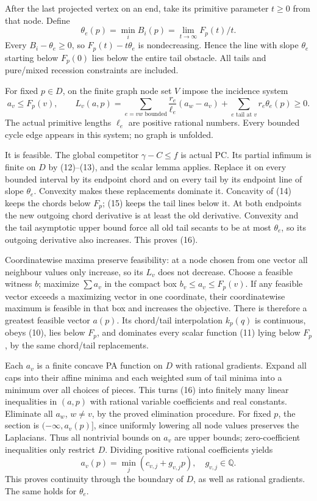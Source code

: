 \documentclass[
  11pt,
]{article}
\begin{document}
After the last projected vertex on an end, take its primitive parameter
\(t\geq0\) from that node. Define \[
 \theta_e(p)=\min_iB_i(p)=\lim_{t\to\infty}F_p(t)/t.          \tag{15}
\] Every \(B_i-\theta_e\geq0\), so \(F_p(t)-t\theta_e\) is
nondecreasing. Hence the line with slope \(\theta_e\) starting below
\(F_p(0)\) lies below the entire tail obstacle. All tails and pure/mixed
recession constraints are included.

For fixed \(p\in D\), on the finite graph node set \(V\) impose the
incidence system \[
 a_v\leq F_p(v),\qquad
 L_v(a,p)=\sum_{e=vw\text{ bounded}}\frac{r_e}{\ell_e}(a_w-a_v)
              +\sum_{e\text{ tail at }v}r_e\theta_e(p)\geq0.             \tag{16}
\] The actual primitive lengths \(\ell_e\) are positive rational
numbers. Every bounded cycle edge appears in this system; no graph is
unfolded.

It is feasible. The global competitor \(\gamma-C\leq f\) is actual PC.
Its partial infimum is finite on \(D\) by (12)--(13), and the scalar
lemma applies. Replace it on every bounded interval by its endpoint
chord and on every tail by its endpoint line of slope \(\theta_e\).
Convexity makes these replacements dominate it. Concavity of (14) keeps
the chords below \(F_p\); (15) keeps the tail lines below it. At both
endpoints the new outgoing chord derivative is at least the old
derivative. Convexity and the tail asymptotic upper bound force all old
tail secants to be at most \(\theta_e\), so its outgoing derivative also
increases. This proves (16).

Coordinatewise maxima preserve feasibility: at a node chosen from one
vector all neighbour values only increase, so its \(L_v\) does not
decrease. Choose a feasible witness \(b\); maximize \(\sum a_v\) in the
compact box \(b_v\leq a_v\leq F_p(v)\). If any feasible vector exceeds a
maximizing vector in one coordinate, their coordinatewise maximum is
feasible in that box and increases the objective. There is therefore a
greatest feasible vector \(a(p)\). Its chord/tail interpolation
\(k_p(q)\) is continuous, obeys (10), lies below \(F_p\), and dominates
every scalar function (11) lying below \(F_p\), by the same chord/tail
replacements.

Each \(a_v\) is a finite concave PA function on \(D\) with rational
gradients. Expand all caps into their affine minima and each weighted
sum of tail minima into a minimum over all choices of pieces. This turns
(16) into finitely many linear inequalities in \((a,p)\) with rational
variable coefficients and real constants. Eliminate all \(a_w\),
\(w\ne v\), by the proved elimination procedure. For fixed \(p\), the
section is \((-\infty,a_v(p)]\), since uniformly lowering all node
values preserves the Laplacians. Thus all nontrivial bounds on \(a_v\)
are upper bounds; zero-coefficient inequalities only restrict \(D\).
Dividing positive rational coefficients yields \[
                       a_v(p)=\min_j(c_{v,j}+g_{v,j}p),\quad
                       g_{v,j}\in\mathbb{Q}.                 \tag{17}
\] This proves continuity through the boundary of \(D\), as well as
rational gradients. The same holds for \(\theta_e\).
\end{document}
